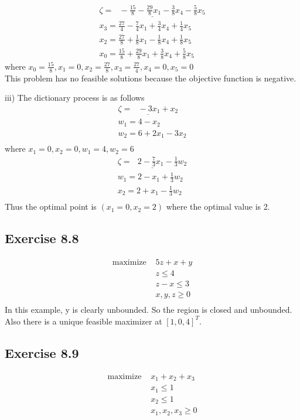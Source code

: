 \documentclass[11.5pt, letterpaper, bibtotoc,
    tablecaptionabove, figurecaptionabove]{article}
\begin{document}
\begin{align*}
	\underline{\zeta = \:\:\: -\frac{15}{8} - \frac{29}{8}x_1 - \frac{3}{8}x_4 - \frac{5}{8}x_5}\\
	x_3 = \frac{27}{4} - \frac{7}{4}x_1 + \frac{3}{4}x_4 + \frac{1}{4}x_5\\
	x_2 = \frac{27}{8} + \frac{1}{8}x_1 - \frac{1}{8}x_4 + \frac{1}{8}x_5 \\
	x_0 = \frac{15}{8} + \frac{29}{8}x_1 + \frac{3}{8}x_4 + \frac{5}{8}x_5
\end{align*}
where $x_0 = \frac{15}{8}, x_1 = 0, x_2 = \frac{27}{8}, x_3 = \frac{27}{4}, x_4 = 0, x_5 = 0$   \\
This problem has no feasible solutions because the objective function is negative.

iii)
The dictionary process is as follows
\begin{align*}
	\underline{\zeta = \:\:\: -3x_1 + x_2}\\
	w_1 = 4 -x_2\\
	w_2 = 6 + 2x_1 - 3x_2 \\
\end{align*}
where $x_1 = 0, x_2 = 0, w_1 = 4, w_2 = 6$   \\
\begin{align*}
	\underline{\zeta = \:\:\: 2 - \frac{7}{3}x_1 - \frac{1}{3}w_2}\\
	w_1= 2 - x_1 + \frac{1}{3}w_2\\
	x_2 = 2 + x_1 - \frac{1}{3}w_2\\
\end{align*}
Thus the optimal point is $(x_1=0, x_2=2)$ where the optimal value is 2.  

\subsection*{Exercise 8.8}
\begin{align*}
	\text{maximize  } &5z + x + y \\
	& z \leq 4\\
	& z - x \leq 3 \\
	& x, y, z \geq 0\\
\end{align*}
In this example, y is clearly unbounded. So the region is closed and unbounded.  Also there is a unique feasible maximizer at $[1, 0, 4]^T$.

\subsection*{Exercise 8.9}
\begin{align*}
	\text{maximize  } &x_1 + x_2 + x_3 \\
	& x_1 \leq 1\\
	& x_2 \leq 1\\
	& x_1, x_2, x_3 \geq 0
\end{align*}
\end{document}

